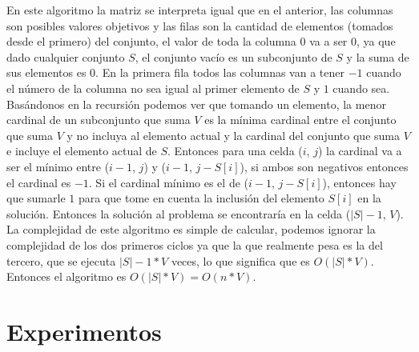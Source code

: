 \documentclass[a4paper]{article}
\begin{document}
En este algoritmo la matriz se interpreta igual que en el anterior, las columnas son posibles valores objetivos y las filas son la cantidad de elementos (tomados desde el primero) del conjunto, el valor de toda la columna $0$ va a ser $0$, ya que dado cualquier conjunto $S$, el conjunto vacío es un subconjunto de $S$ y la suma de sus elementos es $0$. En la primera fila todos las columnas van a tener $-1$ cuando el número de la columna no sea igual al primer elemento de $S$ y $1$ cuando sea. Basándonos en la recursión podemos ver que tomando un elemento, la menor cardinal de un subconjunto que suma $V$ es la mínima cardinal entre el conjunto que suma $V$ y no incluya al elemento actual y la cardinal del conjunto que suma $V$ e incluye el elemento actual de $S$. Entonces para una celda ($i$, $j$) la cardinal va a ser el mínimo entre ($i-1$, $j$) y
($i-1$, $j-S[i]$), si ambos son negativos entonces el cardinal es $-1$. Si el cardinal mínimo es el de ($i-1$, $j-S[i]$), entonces hay que sumarle $1$ para que tome en cuenta la inclusión del elemento $S[i]$ en la solución. Entonces la solución al problema se encontraría en la celda ($|S|-1$, $V$).
\\
La complejidad de este algoritmo es simple de calcular, podemos ignorar la complejidad de los dos primeros ciclos ya que la que realmente pesa es la del tercero, que se ejecuta $|S|-1 * V$ veces, lo que significa que es $O(|S|*V)$.
\\
Entonces el algoritmo es $O(|S|*V) = O(n*V)$.

\pagebreak

\section{Experimentos}
\end{document}

